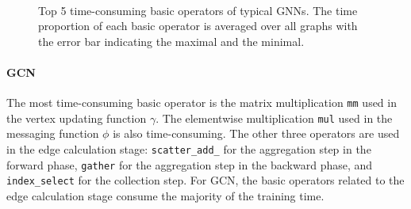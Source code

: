 \begin{figure}[tbp]
    \centering
    \\
    \caption{Top 5 time-consuming basic operators of typical GNNs. The time proportion of each basic operator is averaged over all graphs with the error bar indicating the maximal and the minimal.}
    \label{fig:exp_top_basic_ops}
\end{figure}

\paragraph{GCN}
The most time-consuming basic operator is the matrix multiplication \texttt{mm} used in the vertex updating function $\gamma$.
The elementwise multiplication \texttt{mul} used in the messaging function $\phi$ is also time-consuming.
The other three operators are used in the edge calculation stage: \texttt{scatter\_add\_} for the aggregation step in the forward phase, \texttt{gather} for the aggregation step in the backward phase, and \texttt{index\_select} for the collection step.
For GCN, the basic operators related to the edge calculation stage consume the majority of the training time.


